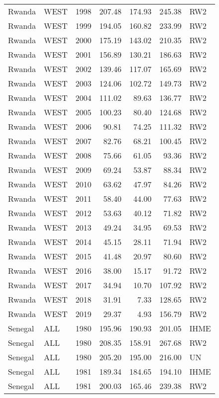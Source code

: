 \begin{longtable}{lllrrrl}
  Rwanda & WEST & 1998 & 207.48 & 174.93 & 245.38 & RW2 \\ 
  Rwanda & WEST & 1999 & 194.05 & 160.82 & 233.99 & RW2 \\ 
  Rwanda & WEST & 2000 & 175.19 & 143.02 & 210.35 & RW2 \\ 
  Rwanda & WEST & 2001 & 156.89 & 130.21 & 186.63 & RW2 \\ 
  Rwanda & WEST & 2002 & 139.46 & 117.07 & 165.69 & RW2 \\ 
  Rwanda & WEST & 2003 & 124.06 & 102.72 & 149.73 & RW2 \\ 
  Rwanda & WEST & 2004 & 111.02 & 89.63 & 136.77 & RW2 \\ 
  Rwanda & WEST & 2005 & 100.23 & 80.40 & 124.68 & RW2 \\ 
  Rwanda & WEST & 2006 & 90.81 & 74.25 & 111.32 & RW2 \\ 
  Rwanda & WEST & 2007 & 82.76 & 68.21 & 100.45 & RW2 \\ 
  Rwanda & WEST & 2008 & 75.66 & 61.05 & 93.36 & RW2 \\ 
  Rwanda & WEST & 2009 & 69.24 & 53.87 & 88.34 & RW2 \\ 
  Rwanda & WEST & 2010 & 63.62 & 47.97 & 84.26 & RW2 \\ 
  Rwanda & WEST & 2011 & 58.40 & 44.00 & 77.63 & RW2 \\ 
  Rwanda & WEST & 2012 & 53.63 & 40.12 & 71.82 & RW2 \\ 
  Rwanda & WEST & 2013 & 49.24 & 34.95 & 69.53 & RW2 \\ 
  Rwanda & WEST & 2014 & 45.15 & 28.11 & 71.94 & RW2 \\ 
  Rwanda & WEST & 2015 & 41.48 & 20.97 & 80.60 & RW2 \\ 
  Rwanda & WEST & 2016 & 38.00 & 15.17 & 91.72 & RW2 \\ 
  Rwanda & WEST & 2017 & 34.94 & 10.70 & 107.92 & RW2 \\ 
  Rwanda & WEST & 2018 & 31.91 & 7.33 & 128.65 & RW2 \\ 
  Rwanda & WEST & 2019 & 29.37 & 4.93 & 156.79 & RW2 \\ 
  Senegal & ALL & 1980 & 195.96 & 190.93 & 201.05 & IHME \\ 
  Senegal & ALL & 1980 & 208.35 & 158.91 & 267.68 & RW2 \\ 
  Senegal & ALL & 1980 & 205.20 & 195.00 & 216.00 & UN \\ 
  Senegal & ALL & 1981 & 189.34 & 184.65 & 194.10 & IHME \\ 
  Senegal & ALL & 1981 & 200.03 & 165.46 & 239.38 & RW2 \\ 

\end{longtable}
